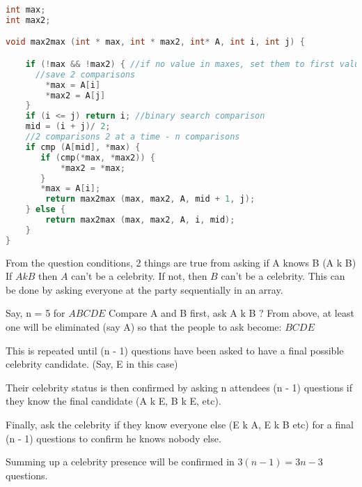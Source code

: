 \documentclass[11pt, a4paper]{article}
\begin{document}
\begin{lstlisting}[frame=single, language=c]
int max;
int max2;

void max2max (int * max, int * max2, int* A, int i, int j) {

    if (!max && !max2) { //if no value in maxes, set them to first values
      //save 2 comparisons
        *max = A[i]
        *max2 = A[j]
    }
    if (i <= j) return i; //binary search comparison
    mid = (i + j)/ 2;
    //2 comparisons 2 at a time - n comparisons
    if cmp (A[mid], *max) {
       if (cmp(*max, *max2)) {
           *max2 = *max;
       }
       *max = A[i];
        return max2max (max, max2, A, mid + 1, j);
    } else {
        return max2max (max, max2, A, i, mid);
    }
}
\end{lstlisting}



From the question conditions, 2 things are true from asking if A knows B (A k B)
If $A k B$ then $A$ can't be a celebrity. If not, then $B$ can't be a celebrity.
This can be done by asking everyone at the party sequentially in an array.

Say, n = 5 for $ A B C D E$
Compare A and B first, ask A k B ?
From above, at least one will be eliminated (say A) so that the people to ask become:
$B C D E$

This is repeated until (n - 1) questions have been asked to have a final possible celebrity candidate. (Say, E in this case)

Their celebrity status is then confirmed by asking n attendees (n - 1) questions if they know the final candidate (A k E, B k E, etc).

Finally, ask the celebrity if they know everyone else (E k A, E k B etc) for a final (n - 1) questions to confirm he knows nobody else.

Summing up a celebrity presence will be confirmed in $ 3(n-1) = 3n - 3$ questions.
\end{document}
